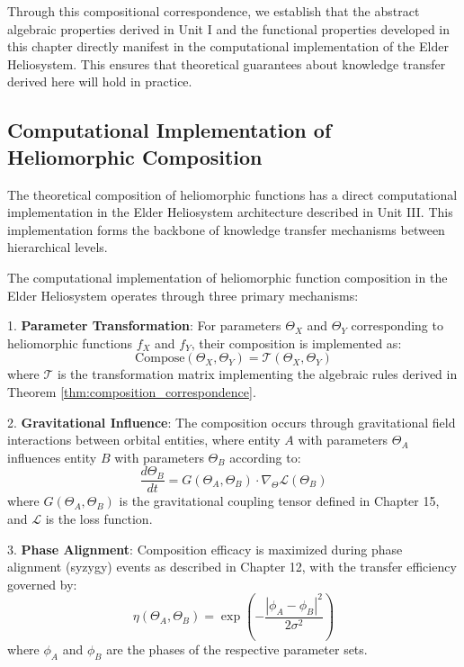 Through this compositional correspondence, we establish that the abstract algebraic properties derived in Unit I and the functional properties developed in this chapter directly manifest in the computational implementation of the Elder Heliosystem. This ensures that theoretical guarantees about knowledge transfer derived here will hold in practice.

\subsection{Computational Implementation of Heliomorphic Composition}

The theoretical composition of heliomorphic functions has a direct computational implementation in the Elder Heliosystem architecture described in Unit III. This implementation forms the backbone of knowledge transfer mechanisms between hierarchical levels.

\begin{definition}
\label{def:computational_composition}
The computational implementation of heliomorphic function composition in the Elder Heliosystem operates through three primary mechanisms:

1. \textbf{Parameter Transformation}: For parameters $\Theta_X$ and $\Theta_Y$ corresponding to heliomorphic functions $f_X$ and $f_Y$, their composition is implemented as:
\begin{equation}
\text{Compose}(\Theta_X, \Theta_Y) = \mathcal{T}(\Theta_X, \Theta_Y)
\end{equation}
where $\mathcal{T}$ is the transformation matrix implementing the algebraic rules derived in Theorem \ref{thm:composition_correspondence}.

2. \textbf{Gravitational Influence}: The composition occurs through gravitational field interactions between orbital entities, where entity $A$ with parameters $\Theta_A$ influences entity $B$ with parameters $\Theta_B$ according to:
\begin{equation}
\frac{d\Theta_B}{dt} = G(\Theta_A, \Theta_B) \cdot \nabla_{\Theta} \mathcal{L}(\Theta_B)
\end{equation}
where $G(\Theta_A, \Theta_B)$ is the gravitational coupling tensor defined in Chapter 15, and $\mathcal{L}$ is the loss function.

3. \textbf{Phase Alignment}: Composition efficacy is maximized during phase alignment (syzygy) events as described in Chapter 12, with the transfer efficiency governed by:
\begin{equation}
\eta(\Theta_A, \Theta_B) = \exp\left(-\frac{|\phi_A - \phi_B|^2}{2\sigma^2}\right)
\end{equation}
where $\phi_A$ and $\phi_B$ are the phases of the respective parameter sets.
\end{definition}

